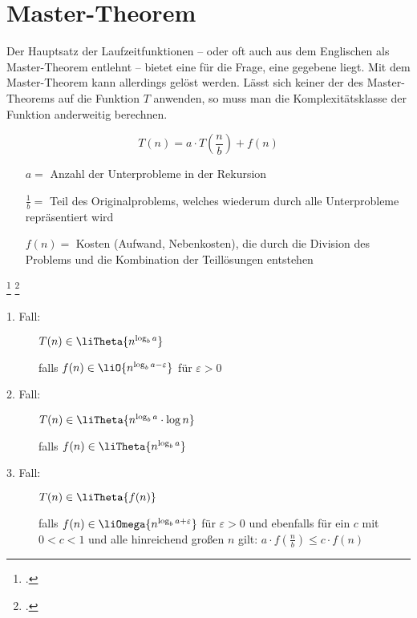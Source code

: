 \documentclass{lehramt-informatik-haupt}
\begin{document}
\let\T=\liTheta
\let\O=\liO
\let\o=\liOmega

\section{Master-Theorem}

Der Hauptsatz der Laufzeitfunktionen – oder oft auch aus dem Englischen
als Master-Theorem entlehnt – bietet eine  für
die Frage,  eine gegebene
 liegt. Mit dem Master-Theorem kann
allerdings  gelöst
werden. Lässt sich keiner der  des
Master-Theorems auf die Funktion $T$ anwenden, so muss man die
Komplexitätsklasse der Funktion anderweitig berechnen.

\begin{displaymath}
T(n) = a \cdot T \left( \textstyle{\frac{n}{b}} \right) + f(n)
\end{displaymath}

\begin{itemize}
\item[$a =$]
Anzahl der Unterprobleme in der Rekursion

\item[$\textstyle{\frac{1}{b}} =$]
Teil des Originalproblems, welches wiederum durch alle Unterprobleme
repräsentiert wird

\item[$f(n) =$]
Kosten (Aufwand, Nebenkosten), die durch die Division des Problems und
die Kombination der Teillösungen entstehen
\end{itemize}
\footcite{wiki:master-theorem}
\footcite[Seite 19-35 (PDF 11-24)]{aud:fs:2}

\begin{description}
\item[1. Fall:]
$T(n) \in \T{n^{\log_{b}a}}$

\hfill falls $f(n) \in \O{n^{\log_{b} a - \varepsilon}}$
für $\varepsilon > 0$

\item[2. Fall:]
$T(n) \in \T{n^{\log_{b}a} \cdot \log n}$

\hfill falls $f(n) \in \T{n^{\log_{b}a}}$

\item[3. Fall:]
$T(n) \in \T{f(n)}$

\hfill falls $f(n) \in \o{n^{\log_{b} a + \varepsilon}}$
für $\varepsilon > 0$
und ebenfalls für ein $c$ mit $0<c<1$ und alle hinreichend großen $n$
gilt:
$a \cdot f(\textstyle {\frac {n}{b}})\leq c \cdot f(n)$
\end{description}

\literatur
\end{document}
